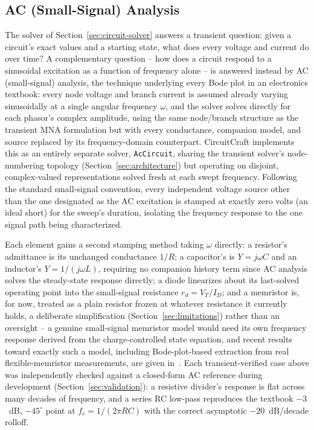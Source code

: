 \subsection{AC (Small-Signal) Analysis}
\label{sec:ac-analysis}

The solver of Section~\ref{sec:circuit-solver} answers a transient question: given a
circuit's exact values and a starting state, what does every voltage and current do over
time? A complementary question -- how does a circuit respond to a sinusoidal excitation as a
function of frequency alone -- is answered instead by AC (small-signal) analysis, the
technique underlying every Bode plot in an electronics textbook: every node voltage and
branch current is assumed already varying sinusoidally at a single angular frequency
$\omega$, and the solver solves directly for each phasor's complex amplitude, using the same
node/branch structure as the transient MNA formulation but with every conductance,
companion model, and source replaced by its frequency-domain counterpart. CircuitCraft
implements this as an entirely separate solver, \texttt{AcCircuit}, sharing the transient
solver's node-numbering topology (Section~\ref{sec:architecture}) but operating on disjoint,
complex-valued representations solved fresh at each swept frequency. Following the standard
small-signal convention, every independent voltage source other than the one designated as
the AC excitation is stamped at exactly zero volts (an ideal short) for the sweep's duration,
isolating the frequency response to the one signal path being characterized.

Each element gains a second stamping method taking $\omega$ directly: a resistor's admittance
is its unchanged conductance $1/R$; a capacitor's is $Y=j\omega C$ and an inductor's
$Y=1/(j\omega L)$, requiring no companion history term since AC analysis solves the
steady-state response directly; a diode linearizes about its last-solved operating point into
the small-signal resistance $r_d=V_T/I_D$; and a memristor is, for now, treated as a plain
resistor frozen at whatever resistance it currently holds, a deliberate simplification
(Section~\ref{sec:limitations}) rather than an oversight -- a genuine small-signal memristor
model would need its own frequency response derived from the charge-controlled state
equation, and recent results toward exactly such a model, including Bode-plot-based
extraction from real flexible-memristor measurements, are given
in~\cite{gater2026smallsignal,gater2025bodeplots}. Each transient-verified case above was
independently checked against a closed-form AC reference during development
(Section~\ref{sec:validation}): a resistive divider's response is flat across many decades of
frequency, and a series RC low-pass reproduces the textbook $-3$~dB, $-45^\circ$ point at
$f_c=1/(2\pi RC)$ with the correct asymptotic $-20$~dB/decade rolloff.

